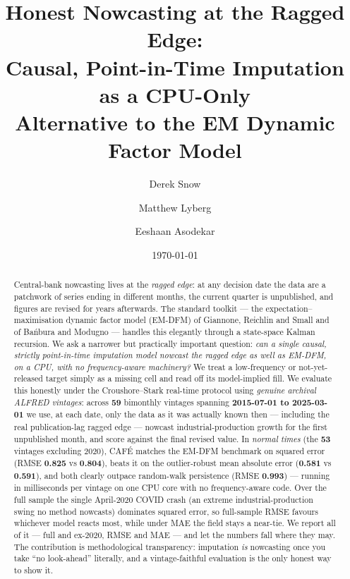 \documentclass[11pt]{article}
\title{\textbf{Honest Nowcasting at the Ragged Edge:\\
Causal, Point-in-Time Imputation as a CPU-Only\\
Alternative to the EM Dynamic Factor Model}}
\author[1]{Derek Snow}
\author[1]{Matthew Lyberg}
\author[1]{Eeshaan Asodekar}
\affil[1]{Sovai Research \quad \texttt{d.snow@sov.ai}}
\date{\today}
\newcommand{\cafe}{CAF\'E}
\begin{document}
\maketitle

\begin{abstract}
\noindent
Central-bank nowcasting lives at the \emph{ragged edge}: at any decision date the
data are a patchwork of series ending in different months, the current quarter is
unpublished, and figures are revised for years afterwards. The standard toolkit ---
the expectation--maximisation dynamic factor model (EM-DFM) of Giannone, Reichlin and
Small and of Ba\'nbura and Modugno --- handles this elegantly through a state-space
Kalman recursion. We ask a narrower but practically important question: \emph{can a
single causal, strictly point-in-time imputation model nowcast the ragged edge as well
as EM-DFM, on a CPU, with no frequency-aware machinery?} We treat a low-frequency or
not-yet-released target simply as a missing cell and read off its model-implied fill.
We evaluate this honestly under the Croushore--Stark real-time protocol using
\emph{genuine archival ALFRED vintages}: across \textbf{59} bimonthly vintages
spanning \textbf{2015-07-01 to 2025-03-01} we use, at each date, only the data as it was actually known
then --- including the real publication-lag ragged edge --- nowcast
industrial-production growth for the first unpublished month, and score against the final
revised value. In \emph{normal times} (the \textbf{53} vintages excluding 2020),
\cafe{} matches the EM-DFM benchmark on squared error (RMSE \textbf{0.825} vs
\textbf{0.804}), beats it on the outlier-robust mean absolute error
(\textbf{0.581} vs \textbf{0.591}), and both clearly outpace random-walk
persistence (RMSE \textbf{0.993}) --- running in milliseconds per vintage on one
CPU core with no frequency-aware code. Over the full sample the single April-2020 COVID
crash (an extreme industrial-production swing no method nowcasts) dominates squared error,
so full-sample RMSE favours whichever model reacts most, while under MAE the field stays a
near-tie. We report all of it --- full and ex-2020, RMSE and MAE --- and let the numbers
fall where they may. The contribution is methodological transparency: imputation \emph{is}
nowcasting once you take ``no look-ahead'' literally, and a vintage-faithful evaluation
is the only honest way to show it.
\end{abstract}
\end{document}
